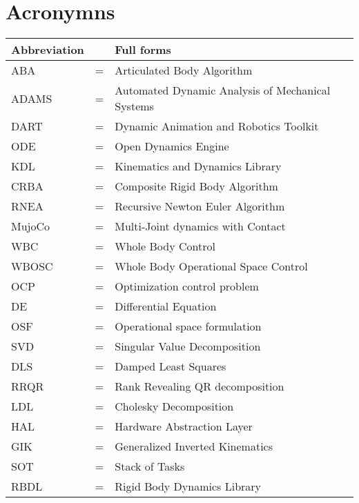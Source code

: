 \documentclass[rnd]{mas_report}
\begin{document}
\chapter*{Acronymns}
\begin{table}[ht!]
\centering
\begin{tabular}{lll}
\hline
\textbf{Abbreviation} &   & \textbf{Full forms}                  \\ \hline
ABA                   & = & Articulated Body Algorithm           \\ 
ADAMS                 & = & Automated Dynamic Analysis of Mechanical Systems\\
DART                  & = & Dynamic Animation and Robotics Toolkit \\
ODE                   & = & Open Dynamics Engine \\
KDL                   & = & Kinematics and Dynamics Library\\
CRBA                  & = & Composite Rigid Body Algorithm \\
RNEA                  & = & Recursive Newton Euler Algorithm\\
MujoCo                & = & Multi-Joint dynamics with Contact    \\ 
WBC                   & = & Whole Body Control                   \\ 
WBOSC                 & = & Whole Body Operational Space Control \\ 
OCP	& = &           Optimization control problem                           \\ 
DE &=& Differential Equation\\
OSF	& = &        Operational space formulation                               \\ 
SVD	& = &     Singular Value Decomposition                          \\ 
DLS	& = &  Damped Least Squares                                \\ 
RRQR & = & Rank Revealing QR decomposition \\
LDL & = & Cholesky Decomposition \\ 
HAL & = & Hardware Abstraction Layer \\
GIK & = & Generalized Inverted Kinematics \\
SOT & = & Stack of Tasks \\
RBDL & = & Rigid Body Dynamics Library \\ \hline

\end{tabular}
\end{table}
\end{document}
